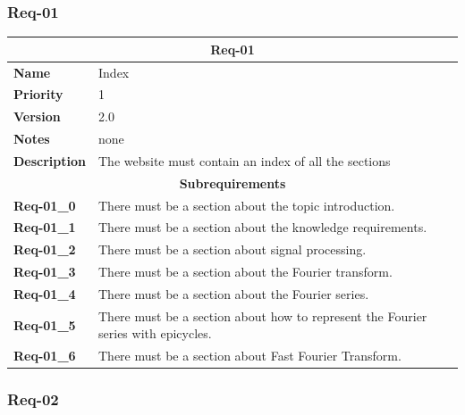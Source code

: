 \documentclass{article}
\begin{document}
\subsubsection{Req-01}

\bgroup{}
\def\arraystretch{1.25}
\begin{center}
    \begin{tabular}{ |l|p{9cm}| }
        \hline
        \multicolumn{2}{|c|}{\textbf{Req-01}} \\
        \hline
        \textbf{Name} & Index \\
        \hline
        \textbf{Priority} & 1 \\
        \hline
        \textbf{Version} & 2.0 \\
        \hline
        \textbf{Notes} & none \\
        \hline
        \textbf{Description}
        & The website must contain an index of all the sections \\
        \hline
        \multicolumn{2}{|c|}{\textbf{Subrequirements}} \\
        \hline
        \textbf{Req-01\_0} & There must be a section about the topic introduction. \\
        \hline
        \textbf{Req-01\_1} & There must be a section about the knowledge requirements. \\
        \hline
        \textbf{Req-01\_2} & There must be a section about signal processing. \\
        \hline
        \textbf{Req-01\_3} & There must be a section about the Fourier transform. \\
        \hline
        \textbf{Req-01\_4} & There must be a section about the Fourier series. \\
        \hline
        \textbf{Req-01\_5} & There must be a section about how to represent the Fourier series with epicycles. \\
        \hline
        \textbf{Req-01\_6} & There must be a section about Fast Fourier Transform. \\
        \hline
    \end{tabular}
\end{center}
\egroup{}

\subsubsection{Req-02}
\end{document}
